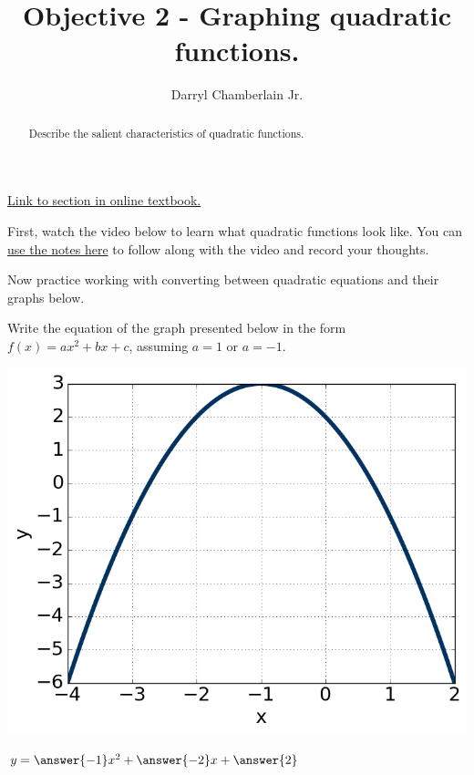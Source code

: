 \documentclass{ximera}
\author{Darryl Chamberlain Jr.}
\title{Objective 2 - Graphing quadratic functions.}
\begin{document}
\begin{abstract}
Describe the salient characteristics of quadratic functions.
\end{abstract}
\maketitle

\href{https://cnx.org/contents/mwjClAV_@8.1:-Sm9he1Q@17/Quadratic-Functions}{Link to section in online textbook.}


First, watch the video below to learn what quadratic functions look like. You can \href{http://people.clas.ufl.edu/dchamberlain31/files/M4-Objective-2-Graphing-Quadratic-Functions.pdf}{use the notes here} to follow along with the video and record your thoughts.


Now practice working with converting between quadratic equations and their graphs below. 

\begin{question}
Write the equation of the graph presented below in the form $f(x)=ax^2+bx+c$, assuming $a=1$ or $a=-1$. 

\begin{center}
	\includegraphics{question1Astatic.png}
\end{center}
$y = \answer{-1} x^2 + \answer{-2} x + \answer{2}$
\end{question}
\end{document}
